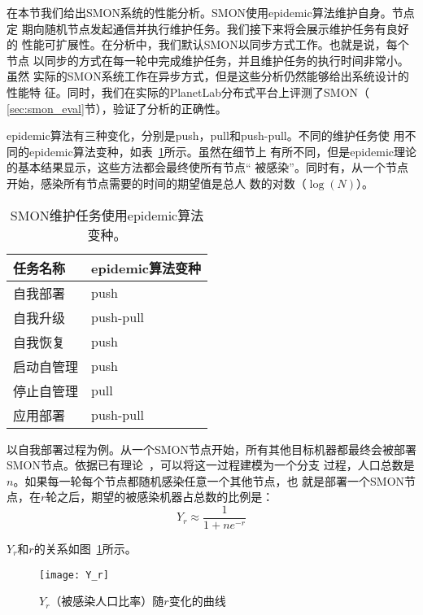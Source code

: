 在本节我们给出SMON系统的性能分析。SMON使用epidemic算法维护自身。节点定
期向随机节点发起通信并执行维护任务。我们接下来将会展示维护任务有良好的
性能可扩展性。在分析中，我们默认SMON以同步方式工作。也就是说，每个节点
以同步的方式在每一轮中完成维护任务，并且维护任务的执行时间非常小。虽然
实际的SMON系统工作在异步方式，但是这些分析仍然能够给出系统设计的性能特
征。同时，我们在实际的PlanetLab分布式平台上评测了SMON（
\ref{sec:smon_eval}节），验证了分析的正确性。

epidemic算法有三种变化，分别是push，pull和push-pull。不同的维护任务使
用不同的epidemic算法变种，如表~\ref{fig:smon_tasks}所示。虽然在细节上
有所不同，但是epidemic理论的基本结果显示，这些方法都会最终使所有节点“
被感染”。同时有，从一个节点开始，感染所有节点需要的时间的期望值是总人
数的对数（$\log(N)$）。

\begin{table}
\centering
\caption{SMON维护任务使用epidemic算法变种。}
\label{fig:smon_tasks}
\begin{tabular}{ll}

\toprule[1.5pt]
任务名称 & epidemic算法变种 \\
\midrule[1pt]
自我部署 & push \\

自我升级 & push-pull \\

自我恢复 & push \\

启动自管理 & push \\

停止自管理 & pull \\

应用部署 & push-pull \\

\bottomrule[1.5pt]
\end{tabular}
\end{table}


以自我部署过程为例。从一个SMON节点开始，所有其他目标机器都最终会被部署
SMON节点。依据已有理论~\cite{Bailey1975}，可以将这一过程建模为一个分支
过程，人口总数是$n$。如果每一轮每个节点都随机感染任意一个其他节点，也
就是部署一个SMON节点，在$r$轮之后，期望的被感染机器占总数的比例是：
\begin{equation*}
Y_r \approx \frac{1}{1+ne^{-r}} 
\end{equation*}

$Y_r$和$r$的关系如图~\ref{fig:self-deploy_Yr}所示。

\begin{figure}
\centering
  \begin{minipage}{0.8\linewidth}
    \centering
    \texttt{[image: Y\_r]}
    \caption{$Y_r$（被感染人口比率）随$r$变化的曲线}
    \label{fig:self-deploy_Yr}
  \end{minipage}
\end{figure}

